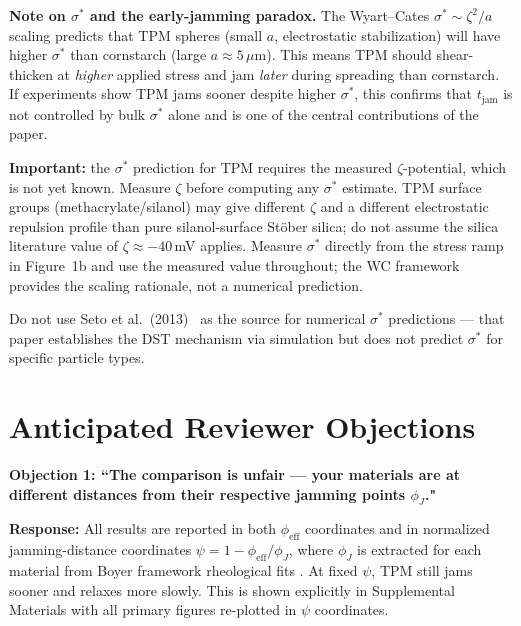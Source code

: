 \documentclass[11pt,letterpaper]{article}
\newcommand{\phieff}{\phi_{\mathrm{eff}}}
\newcommand{\phiJ}{\phi_{J}}
\newcommand{\tjam}{t_{\mathrm{jam}}}
\newcommand{\sigstar}{\sigma^*}
\begin{document}
\begin{cautionbox}
\textbf{Note on $\sigstar$ and the early-jamming paradox.}
The Wyart--Cates $\sigstar \sim \zeta^2/a$ scaling \cite{WyartCates2014,Guy2015}
predicts that TPM spheres (small $a$, electrostatic stabilization) will have
higher $\sigstar$ than cornstarch (large $a \approx 5\,\mu$m). This means TPM
should shear-thicken at \emph{higher} applied stress and jam \emph{later} during
spreading than cornstarch. If experiments show TPM jams sooner despite higher
$\sigstar$, this confirms that $\tjam$ is not controlled by bulk $\sigstar$
alone and is one of the central contributions of the paper.

\noindent\textbf{Important:} the $\sigstar$ prediction for TPM requires the
measured $\zeta$-potential, which is not yet known. Measure $\zeta$ before
computing any $\sigstar$ estimate. TPM surface groups (methacrylate/silanol)
may give different $\zeta$ and a different electrostatic repulsion profile than
pure silanol-surface Stöber silica; do not assume the silica literature value
of $\zeta \approx -40$\,mV applies. Measure $\sigstar$ directly from the
stress ramp in Figure~1b and use the measured value throughout; the WC framework
provides the scaling rationale, not a numerical prediction.

Do not use Seto et al.\ (2013)~\cite{Seto2013} as the source for numerical
$\sigstar$ predictions --- that paper establishes the DST mechanism via
simulation but does not predict $\sigstar$ for specific particle types.
\end{cautionbox}

\section{Anticipated Reviewer Objections}

\begin{reviewbox}
\textbf{Objection 1: ``The comparison is unfair --- your materials are at different
distances from their respective jamming points $\phiJ$."}

\textbf{Response:}
All results are reported in both $\phieff$ coordinates and in normalized
jamming-distance coordinates $\psi = 1 - \phieff/\phiJ$, where $\phiJ$ is
extracted for each material from Boyer framework rheological fits
\cite{Boyer2011}. At fixed $\psi$, TPM still jams sooner and relaxes more
slowly. This is shown explicitly in Supplemental Materials with all primary
figures re-plotted in $\psi$ coordinates.
\end{reviewbox}
\end{document}
